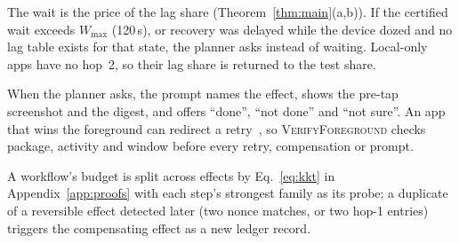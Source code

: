 The wait is the price of the lag share (Theorem~\ref{thm:main}(a,b)). If the certified wait exceeds $W_{\max}$ (120\,s), or recovery was delayed while the device
dozed and no lag table exists for that state, the planner asks instead of waiting. Local-only apps have no hop~2, so their lag share is returned to the test share.

When the planner asks, the prompt names the effect, shows the pre-tap screenshot and the digest, and offers ``done'', ``not done'' and ``not sure''. An app that wins
the foreground can redirect a retry~\cite{qian2026rebinding}, so \textsc{VerifyForeground} checks package, activity and window before every retry, compensation or prompt.

A workflow's budget is split across effects by Eq.~\eqref{eq:kkt} in Appendix~\ref{app:proofs} with each step's strongest family as its probe; a duplicate of a reversible effect detected
later (two nonce matches, or two hop-1 entries) triggers the compensating effect as a new ledger record.

